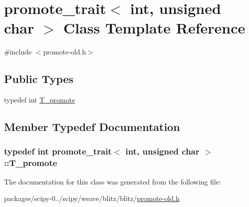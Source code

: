 \hypertarget{classpromote__trait_3_01int_00_01unsigned_01char_01_4}{}\section{promote\+\_\+trait$<$ int, unsigned char $>$ Class Template Reference}
\label{classpromote__trait_3_01int_00_01unsigned_01char_01_4}


{\ttfamily \#include $<$promote-\/old.\+h$>$}

\subsection*{Public Types}
\begin{DoxyCompactItemize}
\item 
typedef int \hyperlink{classpromote__trait_3_01int_00_01unsigned_01char_01_4_ac602e605bdfa6fad94c52a02bdbba1e1}{T\+\_\+promote}
\end{DoxyCompactItemize}


\subsection{Member Typedef Documentation}
\hypertarget{classpromote__trait_3_01int_00_01unsigned_01char_01_4_ac602e605bdfa6fad94c52a02bdbba1e1}{}
\subsubsection[{T\+\_\+promote}]{\setlength{\rightskip}{0pt plus 5cm}typedef int {\bf promote\+\_\+trait}$<$ int, unsigned char $>$\+::{\bf T\+\_\+promote}}\label{classpromote__trait_3_01int_00_01unsigned_01char_01_4_ac602e605bdfa6fad94c52a02bdbba1e1}


The documentation for this class was generated from the following file\+:\begin{DoxyCompactItemize}
\item 
packages/scipy-\/0../scipy/weave/blitz/blitz/\hyperlink{promote-old_8h}{promote-\/old.\+h}\end{DoxyCompactItemize}

